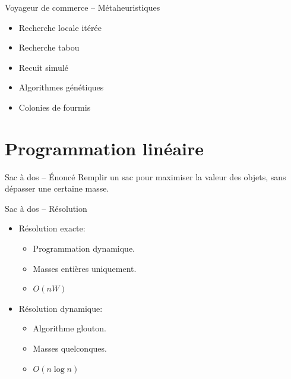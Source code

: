\documentclass{beamer}
\begin{document}
\begin{frame}{Voyageur de commerce -- Métaheuristiques}
    \begin{itemize}
        \item Recherche locale itérée
        \item Recherche tabou
        \item Recuit simulé
        \item Algorithmes génétiques
        \item Colonies de fourmis
    \end{itemize}
\end{frame}

\section{Programmation linéaire}
  \begin{frame}{Sac à dos -- Énoncé}
    Remplir un sac pour maximiser la valeur des objets, sans dépasser une
    certaine masse.
  \end{frame}

  \begin{frame}{Sac à dos -- Résolution}
    \begin{itemize}
      \item Résolution exacte:
      \begin{itemize}
        \item Programmation dynamique.
        \item Masses entières uniquement.
        \item $O(nW)$
      \end{itemize}

      \item Résolution dynamique:
      \begin{itemize}
        \item Algorithme glouton.
        \item Masses quelconques.
        \item $O(n \log n)$
      \end{itemize}
    \end{itemize}
  \end{frame}
\end{document}
